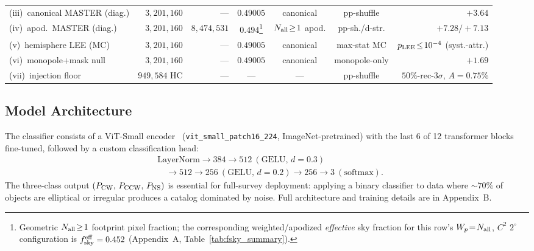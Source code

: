 \documentclass[aps,prd,twocolumn,superscriptaddress,preprintnumbers,nofootinbib,longbibliography,floatfix]{revtex4-2}
\newcommand{\pcw}{P_{\rm CW}}
\newcommand{\pccw}{P_{\rm CCW}}
\newcommand{\pns}{P_{\rm NS}}
\newcommand{\vit}{ViT-Small}
\begin{document}
\begin{table}[t]
\begin{ruledtabular}
\begin{tabular}{lrrcccr}
(iii)~canonical MASTER (diag.) & $3{,}201{,}160$ & --- & $0.49005$ & canonical & pp-shuffle & $+3.64$ \\
(iv)~apod.\ MASTER (diag.) & $3{,}201{,}160$ & $8{,}474{,}531$ & $0.494$\footnote{Geometric $N_{\rm all}\!\ge\!1$ footprint pixel fraction; the corresponding weighted/apodized \emph{effective} sky fraction for this row's $W_p\!=\!N_{\rm all}$, $C^2$ $2^\circ$ configuration is $f_{\rm sky}^{\rm eff}=0.452$ (Appendix~A, Table~\ref{tab:fsky_summary}).} & $N_{\rm all}\!\geq\!1$ apod. & pp-sh./d-str. & $+7.28/{+}7.13$ \\
(v)~hemisphere LEE (MC) & $3{,}201{,}160$ & --- & $0.49005$ & canonical & max-stat MC & $p_{\rm LEE}\!\le\!10^{-4}$ (syst.-attr.) \\
(vi)~monopole+mask null & $3{,}201{,}160$ & --- & $0.49005$ & canonical & monopole-only & $+1.69$ \\
(vii)~injection floor & $949{,}584$ HC & --- & --- & --- & pp-shuffle & $50\%$-rec-$3\sigma$, $A\!=\!0.75\%$ \\
\end{tabular}
\end{ruledtabular}
\end{table}

\subsection{Model Architecture}
\label{sec:architecture}

The classifier consists of a \vit{} encoder~\cite{Dosovitskiy:2020} (\texttt{vit\_small\_patch16\_224}, ImageNet-pretrained) with the last 6 of 12 transformer blocks fine-tuned, followed by a custom classification head:
\begin{equation}
\begin{aligned}
&\text{LayerNorm} \to 384{\to}512~(\text{GELU},\,d{=}0.3) \\
&\quad \to 512{\to}256~(\text{GELU},\,d{=}0.2) \to 256{\to}3~(\text{softmax}).
\end{aligned}
\end{equation}
The three-class output $(\pcw,\,\pccw,\,\pns)$ is essential for full-survey deployment: applying a binary classifier to data where $\sim\!70\%$ of objects are elliptical or irregular produces a catalog dominated by noise. Full architecture and training details are in Appendix~B.
\end{document}
